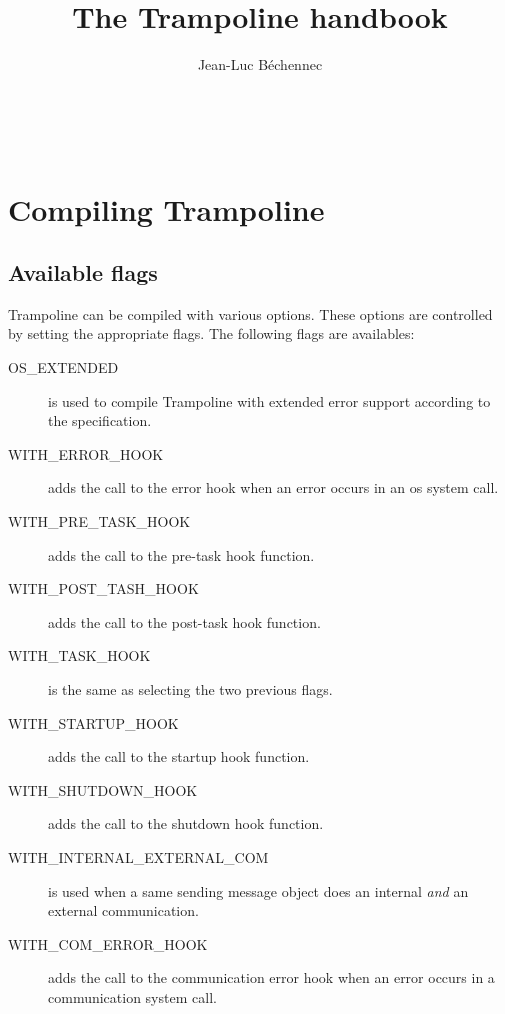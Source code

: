 \documentclass[11pt]{manual}
\title{The Trampoline handbook}
\author{Jean-Luc B\'echennec}
\begin{document}
\maketitle
~\newpage
\setcounter{tocdepth}{2}
\tableofcontents

\chapter{Compiling Trampoline}

\section{Available flags}

Trampoline can be compiled with various options. These options are controlled by setting the appropriate flags. The following flags are availables:
\begin{description}
\item[OS\_EXTENDED] is used to compile Trampoline with extended error support according to the specification.
\item[WITH\_ERROR\_HOOK] adds the call to the error hook when an error occurs in an os system call.
\item[WITH\_PRE\_TASK\_HOOK] adds the call to the pre-task hook function.
\item[WITH\_POST\_TASH\_HOOK]  adds the call to the post-task hook function.
\item[WITH\_TASK\_HOOK] is the same as selecting the two previous flags.
\item[WITH\_STARTUP\_HOOK] adds the call to the startup hook function.
\item[WITH\_SHUTDOWN\_HOOK] adds the call to the shutdown hook function.
\item[WITH\_INTERNAL\_EXTERNAL\_COM] is used when a same sending message object does an internal \emph{and} an external communication.
\item[WITH\_COM\_ERROR\_HOOK] adds the call to the communication error hook when an error occurs in a communication system call.
\end{description}




 
\end{document}
